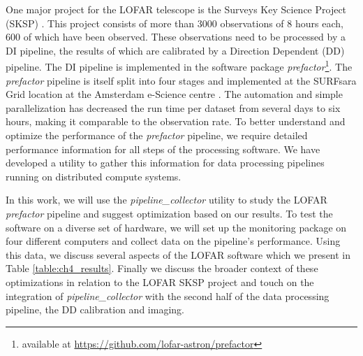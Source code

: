 One major project for the LOFAR telescope is the Surveys Key Science Project (SKSP) \citep{lotss}. This project consists of more than 3000 observations of 8 hours each, 600 of which have been observed. These observations need to be processed by a DI pipeline, the results of which are calibrated by a Direction Dependent (DD) pipeline. The DI pipeline is implemented in the software package \textit{prefactor}\footnote{available at \protect\url{https://github.com/lofar-astron/prefactor}}. The \textit{prefactor} pipeline is itself split into four stages and implemented at the SURFsara Grid location at the Amsterdam e-Science centre \citep{SurfSara,mechev}. The automation and simple parallelization has decreased the run time per dataset from several days to six hours, making it comparable to the observation rate. To better understand and optimize the performance of the \textit{prefactor} pipeline, we require detailed performance information for all steps of the processing software. We have developed a utility to gather this information for data processing pipelines running on distributed compute systems. 

In this work, we will use the \textit{pipeline\_collector} utility to study the LOFAR \textit{prefactor} pipeline and suggest optimization based on our results. To test the software on a diverse set of hardware, we will set up the monitoring package on four different computers and collect data on the pipeline's performance. Using this data, we discuss several aspects of the LOFAR software which we present in Table \ref{table:ch4_results}. Finally we discuss the broader context of these optimizations in relation to the LOFAR SKSP project and touch on the integration of \textit{pipeline\_collector} with the second half of the data processing pipeline, the DD calibration and imaging. 
    
